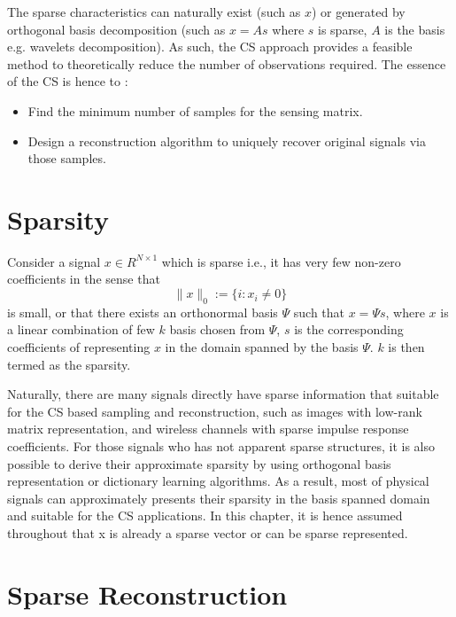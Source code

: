 The sparse characteristics can naturally exist (such
as $x$) or generated by orthogonal basis decomposition (such as $x = As$ where $s$ is sparse, $A$ is the basis e.g. wavelets decomposition). As such, the CS approach provides a feasible method to theoretically reduce the number of observations required. The essence of the CS is hence to :
\begin{itemize}
\item Find the minimum number of samples for the sensing matrix.
\item Design a reconstruction algorithm to uniquely recover original signals via those samples.
\end{itemize}

\section{Sparsity}

Consider a signal $x \in R^{N \times 1}$ which is sparse i.e., it has very few non-zero coefficients in the sense that
\begin{equation}
\label{sparse_eq}
\| x \|_0 := \{i: x_i \neq 0\}
\end{equation}
is small, or that there exists an orthonormal basis $\Psi$ such that $x = \Psi s$, where $x$ is a linear combination of few $k$ basis chosen from $\Psi$, $s$ is the corresponding coefficients of representing $x$ in the domain spanned by the basis $\Psi$. $k$ is then termed as the sparsity.

Naturally, there are many signals directly have sparse information that suitable for the CS based sampling and reconstruction, such as images with low-rank matrix representation, and wireless channels with sparse impulse response coefficients. For those signals who has not apparent sparse structures, it is also possible to derive their approximate sparsity by using orthogonal basis representation or dictionary learning algorithms. As a result, most of physical signals can approximately presents their sparsity in the basis spanned domain and suitable for the CS applications\cite{candes2006robust, candes2006near, rudelson2008sparse, rauhut2012restricted}. In this chapter, it is hence assumed throughout that x is already a sparse vector or can be sparse represented.

\section{Sparse Reconstruction}\label{sct:CS_Recon}

